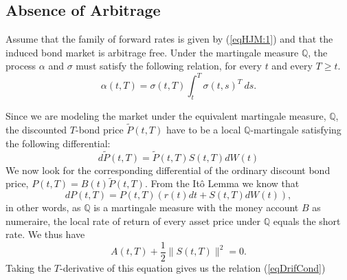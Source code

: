 \subsection{Absence of Arbitrage}
\begin{tma} Assume that the family of forward
  rates is given by (\ref{eqHJM:1}) and that the induced bond market
  is arbitrage free. Under the martingale measure $\mathbb{Q}$, the
  process $\alpha$ and $\sigma$ must satisfy the following relation,
  for every $t$ and every $T\geq t$. 
\begin{equation}
\label{eqDrifCond}
\alpha(t,T)=\sigma(t,T) \int_t^T \sigma(t,s)^T\: ds.
\end{equation}
\end{tma}
\begin{demo}
Since we are modeling the market under the equivalent martingale
measure, $\mathbb{Q}$, the discounted $T$-bond price
$\widetilde{P}(t,T)$ have to be a local $\mathbb{Q}$-martingale
satisfying the following differential:
$$
d\widetilde{P}(t,T)=\widetilde{P}(t,T) S(t,T) dW(t)
$$
We now look for the corresponding differential of the ordinary
discount bond price, $P(t,T)=B(t)\widetilde{P}(t,T)$. From the It\^o
Lemma we know that
\begin{equation}
\label{BondRiskNeutral}
dP(t,T)= P(t,T) \left(r(t) dt + S(t,T) dW(t)\right),
\end{equation}
in other words, as $\mathbb{Q}$ is a martingale measure with the money
account $B$ as numeraire, the local rate of return of every asset
price under $\mathbb{Q}$ equals the short rate. We thus have
$$
A(t,T)+\frac{1}{2}\| S(t,T) \|^2=0.
$$
Taking the $T$-derivative of this equation gives us the relation
(\ref{eqDrifCond})
\end{demo}
